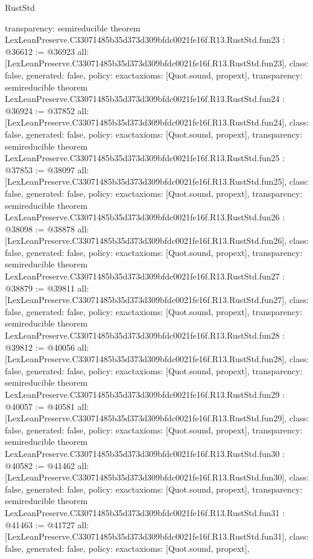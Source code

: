 \begin{lexlean}{RustStd}
\begin{coremodule}
{  transparency: semireducible
}
theorem LexLeanPreserve.C33071485b35d373d309bfdc0021fe16f.R13.RustStd.fun23 : @36612 := @36923 {
  all: [LexLeanPreserve.C33071485b35d373d309bfdc0021fe16f.R13.RustStd.fun23],
  class: false,
  generated: false,
  policy: exact{axioms: [Quot.sound, propext]},
  transparency: semireducible
}
theorem LexLeanPreserve.C33071485b35d373d309bfdc0021fe16f.R13.RustStd.fun24 : @36924 := @37852 {
  all: [LexLeanPreserve.C33071485b35d373d309bfdc0021fe16f.R13.RustStd.fun24],
  class: false,
  generated: false,
  policy: exact{axioms: [Quot.sound, propext]},
  transparency: semireducible
}
theorem LexLeanPreserve.C33071485b35d373d309bfdc0021fe16f.R13.RustStd.fun25 : @37853 := @38097 {
  all: [LexLeanPreserve.C33071485b35d373d309bfdc0021fe16f.R13.RustStd.fun25],
  class: false,
  generated: false,
  policy: exact{axioms: [Quot.sound, propext]},
  transparency: semireducible
}
theorem LexLeanPreserve.C33071485b35d373d309bfdc0021fe16f.R13.RustStd.fun26 : @38098 := @38878 {
  all: [LexLeanPreserve.C33071485b35d373d309bfdc0021fe16f.R13.RustStd.fun26],
  class: false,
  generated: false,
  policy: exact{axioms: [Quot.sound, propext]},
  transparency: semireducible
}
theorem LexLeanPreserve.C33071485b35d373d309bfdc0021fe16f.R13.RustStd.fun27 : @38879 := @39811 {
  all: [LexLeanPreserve.C33071485b35d373d309bfdc0021fe16f.R13.RustStd.fun27],
  class: false,
  generated: false,
  policy: exact{axioms: [Quot.sound, propext]},
  transparency: semireducible
}
theorem LexLeanPreserve.C33071485b35d373d309bfdc0021fe16f.R13.RustStd.fun28 : @39812 := @40056 {
  all: [LexLeanPreserve.C33071485b35d373d309bfdc0021fe16f.R13.RustStd.fun28],
  class: false,
  generated: false,
  policy: exact{axioms: [Quot.sound, propext]},
  transparency: semireducible
}
theorem LexLeanPreserve.C33071485b35d373d309bfdc0021fe16f.R13.RustStd.fun29 : @40057 := @40581 {
  all: [LexLeanPreserve.C33071485b35d373d309bfdc0021fe16f.R13.RustStd.fun29],
  class: false,
  generated: false,
  policy: exact{axioms: [Quot.sound, propext]},
  transparency: semireducible
}
theorem LexLeanPreserve.C33071485b35d373d309bfdc0021fe16f.R13.RustStd.fun30 : @40582 := @41462 {
  all: [LexLeanPreserve.C33071485b35d373d309bfdc0021fe16f.R13.RustStd.fun30],
  class: false,
  generated: false,
  policy: exact{axioms: [Quot.sound, propext]},
  transparency: semireducible
}
theorem LexLeanPreserve.C33071485b35d373d309bfdc0021fe16f.R13.RustStd.fun31 : @41463 := @41727 {
  all: [LexLeanPreserve.C33071485b35d373d309bfdc0021fe16f.R13.RustStd.fun31],
  class: false,
  generated: false,
  policy: exact{axioms: [Quot.sound, propext]},
}
\end{coremodule}
\end{lexlean}
